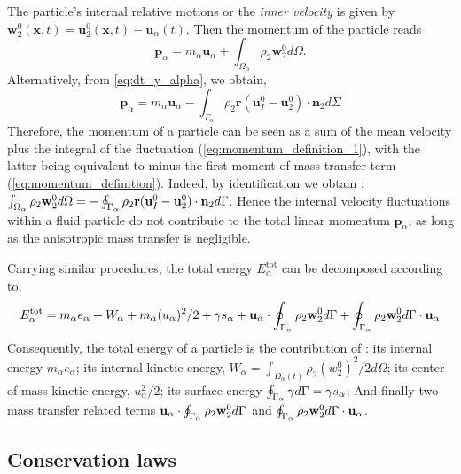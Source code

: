 The particle's internal relative motions or the \textit{inner velocity} is given by $\textbf{w}_2^0(\textbf{x},t) = \textbf{u}_2^0(\textbf{x},t) - \textbf{u}_\alpha(t)$. Then the momentum of the particle reads
\begin{equation}
    \label{eq:momentum_definition_1}
    \textbf{p}_\alpha
    = m_\alpha \textbf{u}_\alpha
    + \int_{\Omega_\alpha} \rho_2 \textbf{w}_2^0 d\Omega.
\end{equation}
Alternatively, from \eqref{eq:dt_y_alpha}, we obtain,
\begin{equation}
    \textbf{p}_\alpha
    =  m_\alpha \textbf{u}_\alpha
    - \int_{\Gamma_\alpha} \rho_2\textbf{r}(\textbf{u}_I^0 - \textbf{u}_2^0)\cdot \textbf{n}_2 d\Sigma
    \label{eq:momentum_definition}
\end{equation}
Therefore, the momentum of a particle can be seen as a sum of the mean velocity plus the integral of the fluctuation (\ref{eq:momentum_definition_1}), with the latter being equivalent to minus the first moment of mass transfer term (\ref{eq:momentum_definition}).
Indeed, by identification we obtain : $\int_{\Omega_\alpha}  \rho_2 \textbf{w}_2^0  d\Omega = - \oint_{\Gamma_\alpha}   \rho_2\textbf{r} (\textbf{u}_I^0 - \textbf{u}_2^0)\cdot \textbf{n}_2  d\Gamma$. 
Hence the internal velocity fluctuations within a fluid particle do not contribute to the total linear momentum $\textbf{p}_\alpha$, as long as the anisotropic mass transfer is negligible.  

Carrying similar procedures, the total energy $E_\alpha^\text{tot}$ can be decomposed according to,
\begin{equation*}
    \label{eq:E_alpha_def}
    E_\alpha^\text{tot}
    = m_\alpha e_\alpha 
    + W_\alpha
    + m_\alpha (u_\alpha)^2/2
    + \gamma s_\alpha 
    + \textbf{u}_\alpha \cdot  \oint_{\Gamma_\alpha}   \rho_2 \textbf{w}_2^0  d\Gamma
    + \oint_{\Gamma_\alpha}   \rho_2 \textbf{w}_2^0  d\Gamma \cdot \textbf{u}_\alpha 
\end{equation*}
Consequently, the total energy of a particle is the contribution of :
its internal energy $m_\alpha e_\alpha$; 
its internal kinetic energy, $W_\alpha = \int_{\Omega_\alpha(t)} \rho_2  (w_2^0)^2/2 d\Omega$;
its center of mass kinetic energy, $u_\alpha^2/2$; 
its surface energy $\oint_{\Gamma_\alpha}  \gamma d\Gamma = \gamma s_\alpha$; 
And finally two mass transfer related terms $\textbf{u}_\alpha \cdot  \oint_{\Gamma_\alpha}   \rho_2 \textbf{w}_2^0  d\Gamma$ and $\oint_{\Gamma_\alpha}   \rho_2 \textbf{w}_2^0  d\Gamma \cdot \textbf{u}_\alpha$. 

\subsection{Conservation laws}

